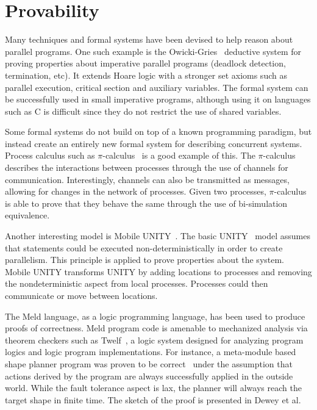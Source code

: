 \section{Provability}

Many techniques and formal systems have been devised to help reason about
parallel programs.  One such example is the
Owicki-Gries~\cite{Owicki:1976:VPP:360051.360224} deductive system for proving
properties about imperative parallel programs (deadlock detection, termination,
etc). It extends Hoare logic with a stronger set axioms such as parallel
execution, critical section and auxiliary variables. The formal system can be
successfully used in small imperative programs, although using it on languages
such as C is difficult since they do not restrict the use of shared variables.

Some formal systems do not build on top of a known programming paradigm, but
instead create an entirely new formal system for describing concurrent systems.
Process calculus such as $\pi$-calculus~\cite{Milner:1999:CMS:329902} is a good
example of this.  The $\pi$-calculus describes the interactions between
processes through the use of channels for communication. Interestingly, channels
can also be transmitted as messages, allowing for changes in the network of
processes.  Given two processes, $\pi$-calculus is able to prove that they
behave the same through the use of bi-simulation equivalence.

Another interesting model is Mobile UNITY~\cite{Roman97anintroduction}. The
basic UNITY~\cite{UNITY} model assumes that statements could be executed
non-deterministically in order to create parallelism. This principle is applied
to prove properties about the system.  Mobile UNITY transforms UNITY by adding
locations to processes and removing the nondeterministic aspect from local
processes. Processes could then communicate or move between locations.

The Meld language, as a logic programming language, has been used to produce
proofs of correctness. Meld program code is amenable to mechanized analysis via
theorem checkers such as Twelf~\cite{twelf}, a logic system designed for
analyzing program logics and logic program implementations.  For instance, a
meta-module based shape planner program was proven to be
correct~\cite{dewey-iros08,ashley-rollman-iclp09} under the assumption that
actions derived by the program are always successfully applied in the outside
world.  While the fault tolerance aspect is lax, the planner will always reach
the target shape in finite time.  The sketch of the proof is presented in Dewey
et al.~\cite{dewey-iros08}

